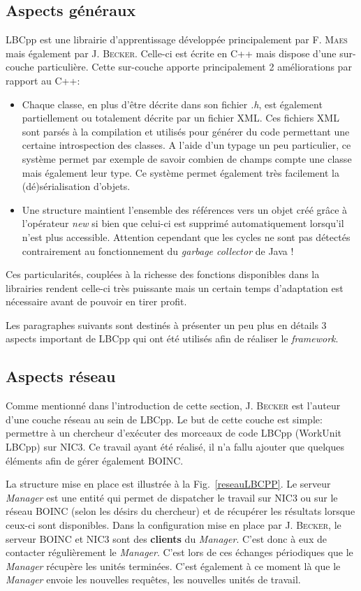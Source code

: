 \documentclass[a4paper, 11pt]{report}
\begin{document}
\subsection{Aspects généraux}
LBCpp est une librairie d'apprentissage développée principalement par F. \textsc{Maes} mais également par J. \textsc{Becker}. Celle-ci est écrite en C++ mais dispose d'une sur-couche particulière. Cette sur-couche apporte principalement 2 améliorations par rapport au C++:
\begin{itemize}
\item Chaque classe, en plus d'être décrite dans son fichier \textit{.h}, est également partiellement ou totalement décrite par un fichier XML. Ces fichiers XML sont parsés à la compilation et utilisés pour générer du code permettant une certaine introspection des classes. A l'aide d'un typage un peu particulier, ce système permet par exemple de savoir combien de champs compte une classe mais également leur type. Ce système permet également très facilement la (dé)sérialisation d'objets.
\item Une structure maintient l'ensemble des références vers un objet créé grâce à l'opérateur \textit{new} si bien que celui-ci est supprimé automatiquement lorsqu'il n'est plus accessible. Attention cependant que les cycles ne sont pas détectés contrairement au fonctionnement du \textit{garbage collector} de Java !
\end{itemize}
Ces particularités, couplées à la richesse des fonctions disponibles dans la librairies rendent celle-ci très puissante mais un certain temps d'adaptation est nécessaire avant de pouvoir en tirer profit.

Les paragraphes suivants sont destinés  à présenter un peu plus en détails 3 aspects important de LBCpp qui ont été utilisés afin de réaliser le \textit{framework}.

\subsection{Aspects réseau}
Comme mentionné dans l'introduction de cette section, J. \textsc{Becker} est l'auteur d'une couche réseau au sein de LBCpp. Le but de cette couche est simple: permettre à un chercheur d'exécuter des morceaux de code LBCpp (WorkUnit LBCpp) sur NIC3. Ce travail ayant été réalisé, il n'a fallu ajouter que quelques éléments afin de gérer également \textsc{BOINC}.

La structure mise en place est illustrée à la Fig.~\ref{reseauLBCPP}. Le serveur \textit{Manager} est une entité qui permet de dispatcher le travail sur NIC3 ou sur le réseau \textsc{BOINC} (selon les désirs du chercheur) et de récupérer les résultats lorsque ceux-ci sont disponibles. Dans la configuration mise en place par J. \textsc{Becker}, le serveur \textsc{BOINC} et NIC3 sont des \textbf{clients} du \textit{Manager}. C'est donc à eux de contacter régulièrement le \textit{Manager}. C'est lors de ces échanges périodiques que le \textit{Manager} récupère les unités terminées. C'est également à ce moment là que le \textit{Manager} envoie les nouvelles requêtes, les nouvelles unités de travail.
\end{document}
